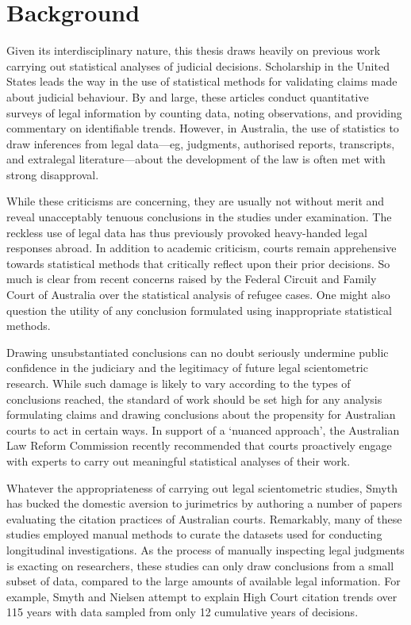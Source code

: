 \let\xn\xnote
\section{Background}


Given its interdisciplinary nature, this thesis draws heavily on previous work carrying out statistical analyses of judicial decisions. Scholarship in the United States leads the way in the use of statistical methods for validating claims made about judicial behaviour.\xn{2-1} By and large, these articles conduct quantitative surveys of legal information by counting data, noting observations, and providing commentary on identifiable trends.\xn{2-2} However, in Australia, the use of statistics to draw inferences from legal data---eg, judgments, authorised reports, transcripts, and extralegal literature---about the development of the law is often met with strong disapproval.\xn{2-3} 

While these criticisms are concerning, they are usually not without merit and reveal unacceptably tenuous conclusions in the studies under examination.\xn{2-3a} The reckless use of legal data has thus previously provoked heavy-handed legal responses abroad.\xn{2-3b} In addition to academic criticism, courts remain apprehensive towards statistical methods that critically reflect upon their prior decisions.\xn{2-3ba} So much is clear from recent concerns raised by the Federal Circuit and Family Court of Australia over the statistical analysis of refugee cases.\xn{2-3bb} One might also question the utility of any conclusion formulated using inappropriate statistical methods.

Drawing unsubstantiated conclusions can no doubt seriously undermine public confidence in the judiciary and the legitimacy of future legal scientometric research.\xn{2-3bc} While such damage is likely to vary according to the types of conclusions reached, the standard of work should be set high for any analysis formulating claims and drawing conclusions about the propensity for Australian courts to act in certain ways. In support of a `nuanced approach', the Australian Law Reform Commission recently recommended that courts proactively engage with experts to carry out meaningful statistical analyses of their work.\xn{2-3c}

Whatever the appropriateness of carrying out legal scientometric studies, Smyth has  bucked the domestic aversion to jurimetrics by authoring a number of papers evaluating the citation practices of Australian courts.\xn{2-4} Remarkably, many of these studies employed manual methods to curate the datasets used for conducting longitudinal investigations.\xn{2-5} As the process of manually inspecting legal judgments is exacting on researchers, these studies can only draw conclusions from a small subset of data, compared to the large amounts of available legal information. For example, Smyth and Nielsen attempt to explain High Court citation trends over 115 years with data sampled from only 12 cumulative years of decisions.\xn{2-5a}

